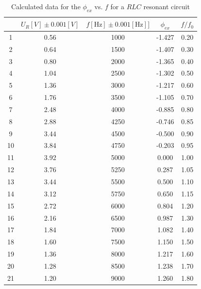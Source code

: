 \documentclass[12pt]{article}
\begin{document}
\begin{table}[H]
\centering
\begin{tabular}{|c|c|c|c|c|}
\hline
   &$U_R[V]\pm0.001[V]$  & $f[\mathrm{Hz}]\pm0.001[\mathrm{Hz}]]$  &$\phi_{ex}$&$f/f_0$       \\ \hline
1  & 0.56      & 1000&-1.427&0.20       \\ \hline
2  & 0.64      & 1500&-1.407&0.30       \\ \hline
3  & 0.80      & 2000&-1.365&0.40       \\ \hline
4  & 1.04      & 2500&-1.302&0.50       \\ \hline
5  & 1.36      & 3000&-1.217&0.60       \\ \hline
6  & 1.76      & 3500&-1.105&0.70       \\ \hline
7  & 2.48      & 4000&-0.885&0.80       \\ \hline
8  & 2.88      & 4250&-0.746&0.85       \\ \hline
9  & 3.44      & 4500&-0.500&0.90       \\ \hline
10 & 3.84      & 4750&-0.203&0.95       \\ \hline
11 & 3.92      & 5000& 0.000&1.00       \\ \hline
12 & 3.76      & 5250& 0.287&1.05       \\ \hline
13 & 3.44      & 5500& 0.500&1.10       \\ \hline
14 & 3.12      & 5750& 0.650&1.15       \\ \hline
15 & 2.72      & 6000& 0.804&1.20       \\ \hline
16 & 2.16      & 6500& 0.987&1.30       \\ \hline
17 & 1.84      & 7000& 1.082&1.40       \\ \hline
18 & 1.60      & 7500& 1.150&1.50       \\ \hline
19 & 1.36      & 8000& 1.217&1.60       \\ \hline
20 & 1.28      & 8500& 1.238&1.70       \\ \hline
21 & 1.20      & 9000& 1.260&1.80       \\ \hline
\end{tabular}
\caption{Calculated data for the $\phi_{ex}$ vs. $f$ for a $RLC$ resonant circuit}
\end{table}
\end{document}
